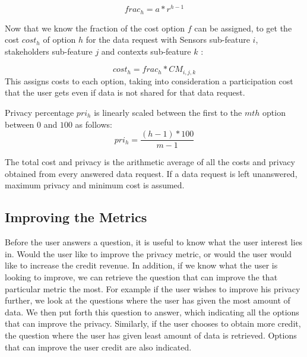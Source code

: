 \begin{equation}
frac_{h} = a * r^{h-1}
\end{equation}

Now that we know the fraction of the cost option $f$ can be assigned, to get the cost $cost_{h}$ of option $h$ for the data request with Sensors sub-feature $i$, stakeholders sub-feature $j$ and
contexts sub-feature $k$ :

\begin{equation}
cost_{h} = frac_{h} * CM_{i,j,k}
\end{equation}
This assigns costs to each option, taking into consideration a participation cost that the user gets even if data is not shared for that data request.

Privacy percentage $pri_{h}$ is linearly scaled between the first to the $mth$ option between $0$ and $100$ as follows:
\begin{equation}
pri_{h} = \frac{(h-1) * 100}{m-1}
\end{equation}

The total cost and privacy is the arithmetic average of all the costs and privacy obtained from every answered data request. If a data request is left unanswered, maximum privacy and minimum cost is assumed.


\subsection{Improving the Metrics}
Before the user answers a question, it is useful to know what the user interest lies in. Would the user like to improve
the privacy metric, or would the user would like to increase the credit revenue. In addition, if we know what the user is looking to improve, we can retrieve the question that can improve the that particular metric the most.
For example if the user wishes to improve his privacy further, we look at the questions where the user has given the most amount of data. We then put forth this question to answer, which indicating all the options that can improve the privacy. Similarly, if the user chooses to obtain more credit, the question where the user has given least amount of data is retrieved. Options that can improve the user credit are also indicated.


